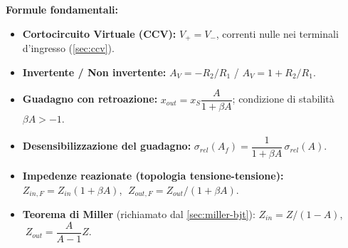 \begin{note}
\textbf{Formule fondamentali:}
\begin{itemize}
    \item \textbf{Cortocircuito Virtuale (CCV):} $V_+ = V_-$, correnti nulle nei terminali d'ingresso (\cref{sec:ccv}).
    \item \textbf{Invertente / Non invertente:} $A_V = -R_2/R_1$ \quad / \quad $A_V = 1+R_2/R_1$.
    \item \textbf{Guadagno con retroazione:} $x_{out} = x_S \dfrac{A}{1+\beta A}$; condizione di stabilità $\beta A > -1$.
    \item \textbf{Desensibilizzazione del guadagno:} $\sigma_{rel}(A_f) = \dfrac{1}{1+\beta A}\,\sigma_{rel}(A)$.
    \item \textbf{Impedenze reazionate (topologia tensione-tensione):} $Z_{in,F} = Z_{in}(1+\beta A)$, $\; Z_{out,F} = Z_{out}/(1+\beta A)$.
    \item \textbf{Teorema di Miller} (richiamato dal \cref{sec:miller-bjt}): $Z_{in} = Z/(1-A)$, $\; Z_{out} = \dfrac{A}{A-1}Z$.
\end{itemize}
\end{note}

